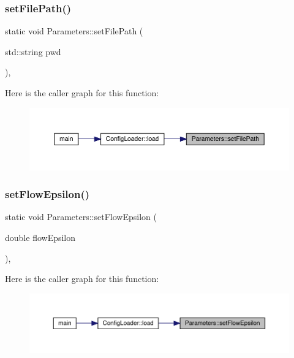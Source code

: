 \subsubsection{\texorpdfstring{setFilePath()}{setFilePath()}}
{\footnotesize\ttfamily static void Parameters\+::set\+File\+Path (\begin{DoxyParamCaption}\item[{std\+::string}]{pwd }\end{DoxyParamCaption})\hspace{0.3cm}{\ttfamily [inline]}, {\ttfamily [static]}}

Here is the caller graph for this function\+:
\nopagebreak
\begin{figure}[H]
\begin{center}
\leavevmode
\includegraphics[width=350pt]{class_parameters_a5afe30ba482014c176433bb183a68976_icgraph}
\end{center}
\end{figure}
\mbox{\label{class_parameters_a9114804031d3c9342f590ce223a8b5a7}} 
\subsubsection{\texorpdfstring{setFlowEpsilon()}{setFlowEpsilon()}}
{\footnotesize\ttfamily static void Parameters\+::set\+Flow\+Epsilon (\begin{DoxyParamCaption}\item[{double}]{flow\+Epsilon }\end{DoxyParamCaption})\hspace{0.3cm}{\ttfamily [inline]}, {\ttfamily [static]}}

Here is the caller graph for this function\+:
\nopagebreak
\begin{figure}[H]
\begin{center}
\leavevmode
\includegraphics[width=350pt]{class_parameters_a9114804031d3c9342f590ce223a8b5a7_icgraph}
\end{center}
\end{figure}
\mbox{\label{class_parameters_ad7a6cb2ff449a75c13df52c786da7b98}} 
